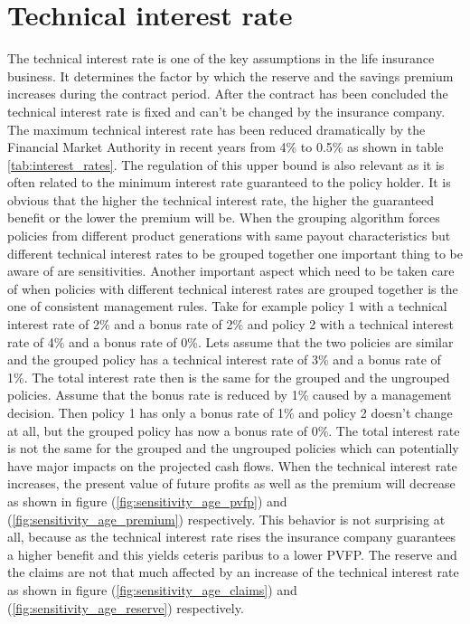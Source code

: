 \section{Technical interest rate}
\label{sec:technical_interest_rate} 
The technical interest rate is one of the key assumptions in the life insurance business. It determines the factor by which the reserve and the savings premium increases during the contract period. After the contract has been concluded the technical interest rate is fixed and can't be changed by the insurance company. The maximum technical interest rate has been reduced dramatically by the Financial Market Authority in recent years from 4\% to 0.5\% as shown in table \ref{tab:interest_rates}.  The regulation of this upper bound is also relevant as it is often related to the minimum interest rate guaranteed to the policy holder. It is obvious that the higher the  technical interest rate, the higher the guaranteed benefit or the lower the premium will be. When the grouping algorithm forces policies from different product generations with same payout characteristics but different technical interest rates to be grouped together one important thing to be aware of are sensitivities. Another important aspect which need to be taken care of when policies with different technical interest rates are grouped together is the one of consistent management rules.  Take for example policy 1 with a technical interest rate of 2\% and a bonus rate of 2\% and policy 2 with a technical interest rate of 4\% and a bonus rate of 0\%. Lets assume that the two policies are similar and the grouped policy has a technical interest rate of 3\% and a bonus rate of 1\%. The total interest rate then is the same for the grouped and the ungrouped policies. Assume that the bonus rate is reduced by 1\% caused by a management decision. Then policy 1 has only a bonus rate of 1\% and policy 2 doesn't change at all, but the grouped policy has now a bonus rate of 0\%. The total interest rate is not the same for the grouped and the ungrouped policies which can potentially have major impacts on the projected cash flows. When the technical interest rate increases, the present value of future profits as well as the premium will decrease as shown in figure (\ref{fig:sensitivity_age_pvfp}) and (\ref{fig:sensitivity_age_premium}) respectively. This behavior is not surprising at all, because as the technical interest rate rises the insurance company guarantees a higher benefit and this yields ceteris paribus to a lower PVFP. The reserve and the claims are not that much affected by an increase of the technical interest rate as shown in figure (\ref{fig:sensitivity_age_claims}) and (\ref{fig:sensitivity_age_reserve}) respectively.




